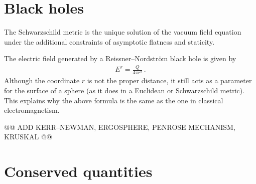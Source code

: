 \section{Black holes}


    \begin{theorem}[Birkhoff]
        The Schwarzschild metric is the unique solution of the vacuum field equation under the additional constraints of asymptotic flatness and staticity.
    \end{theorem}


    \begin{remark}
        The electric field generated by a Reissner--Nordstr\"om black hole is given by
        \begin{gather}
            E^r = \frac{Q}{4\pi r^2}\,.
        \end{gather}
        Although the coordinate $r$ is not the proper distance, it still acts as a parameter for the surface of a sphere (as it does in a Euclidean or Schwarzschild metric). This explains why the above formula is the same as the one in classical electromagnetism.
    \end{remark}

    @@ ADD KERR--NEWMAN, ERGOSPHERE, PENROSE MECHANISM, KRUSKAL @@

\section{Conserved quantities}

